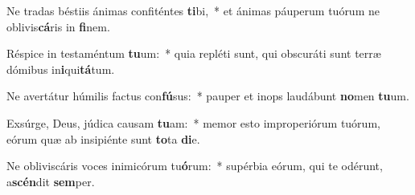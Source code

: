 \item Ne tradas béstiis ánimas confiténtes \textbf{ti}bi,~* et ánimas páuperum tuórum ne oblivis\textbf{cá}ris in \textbf{fi}nem.
\item Réspice in testaméntum \textbf{tu}um:~* quia repléti sunt, qui obscuráti sunt terræ dómibus in\textbf{i}qui\textbf{tá}tum.
\item Ne avertátur húmilis factus con\textbf{fú}sus:~* pauper et inops laudábunt \textbf{no}men \textbf{tu}um.
\item Exsúrge, Deus, júdica causam \textbf{tu}am:~* memor esto improperiórum tuórum, eórum quæ ab insipiénte sunt \textbf{to}ta \textbf{di}e.
\item Ne obliviscáris voces inimicórum tu\textbf{ó}rum:~* supérbia eórum, qui te odérunt, a\textbf{scén}dit \textbf{sem}per.
